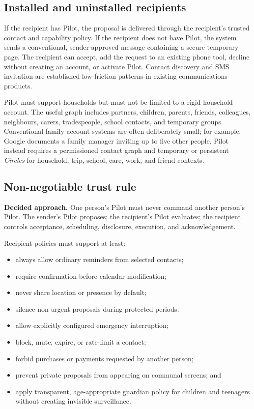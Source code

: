 \documentclass[11pt,a4paper]{article}
\newcommand{\decision}[1]{\par\medskip\noindent\colorbox{pilotblue!9}{\parbox{0.95\linewidth}{\textbf{Decided approach.} #1}}\par\medskip}
\begin{document}
\subsection{Installed and uninstalled recipients}

If the recipient has Pilot, the proposal is delivered through the recipient's
trusted contact and capability policy.  If the recipient does not have Pilot,
the system sends a conventional, sender-approved message containing a secure
temporary page.  The recipient can accept, add the request to an existing
phone tool, decline without creating an account, or activate Pilot.  Contact
discovery and SMS invitation are established low-friction patterns in existing
communications products.\cite{whatsappinvite}

Pilot must support households but must not be limited to a rigid household
account.  The useful graph includes partners, children, parents, friends,
colleagues, neighbours, carers, tradespeople, school contacts, and temporary
groups.  Conventional family-account systems are often deliberately small;
for example, Google documents a family manager inviting up to five other
people.\cite{googlefamily}  Pilot instead requires a permissioned contact graph
and temporary or persistent \emph{Circles} for household, trip, school, care,
work, and friend contexts.

\subsection{Non-negotiable trust rule}

\decision{One person's Pilot must never command another person's Pilot.  The
sender's Pilot proposes; the recipient's Pilot evaluates; the recipient
controls acceptance, scheduling, disclosure, execution, and acknowledgement.}

Recipient policies must support at least:

\begin{itemize}[leftmargin=*]
  \item always allow ordinary reminders from selected contacts;
  \item require confirmation before calendar modification;
  \item never share location or presence by default;
  \item silence non-urgent proposals during protected periods;
  \item allow explicitly configured emergency interruption;
  \item block, mute, expire, or rate-limit a contact;
  \item forbid purchases or payments requested by another person;
  \item prevent private proposals from appearing on communal screens; and
  \item apply transparent, age-appropriate guardian policy for children and
        teenagers without creating invisible surveillance.
\end{itemize}
\end{document}
